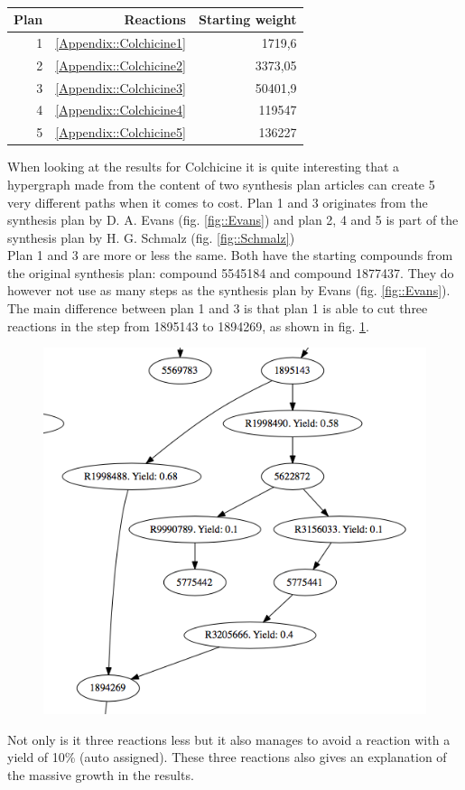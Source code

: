 \documentclass[a4paper,10pt,titlepage]{paper}
\begin{document}
\begin{table}[H]
\centering
\begin{tabular}{|r|r|r|}
\hline
Plan & Reactions & Starting weight \\ \hline
1 & \ref{Appendix::Colchicine1} & 1719,6 \\\hline
2 & \ref{Appendix::Colchicine2} & 3373,05 \\\hline
3 & \ref{Appendix::Colchicine3} & 50401,9 \\\hline
4 & \ref{Appendix::Colchicine4} & 119547 \\\hline
5 & \ref{Appendix::Colchicine5} & 136227 \\\hline
\end{tabular}
\caption{}
\label{tab::ColchicineResults}
\end{table}
When looking at the results for Colchicine it is quite interesting that a hypergraph made from the content of two synthesis plan articles can create 5 very different paths when it comes to cost. Plan 1 and 3 originates from the synthesis plan by D. A. Evans (fig. \ref{fig::Evans}) and plan 2, 4 and 5 is part of the synthesis plan by H. G. Schmalz (fig. \ref{fig::Schmalz})\\

Plan 1 and 3 are more or less the same. Both have the starting compounds from the original synthesis plan: compound 5545184 and compound 1877437. They do however not use as many steps as the synthesis plan by Evans (fig. \ref{fig::Evans}). The main difference between plan 1 and 3 is that plan 1 is able to cut three reactions in the step from 1895143 to 1894269, as shown in fig. \ref{fig::EvansCut}.\\
\begin{figure}[H]
\centering
\includegraphics[scale=0.5]{Billeder/EvansCut.png}
\caption{}
\label{fig::EvansCut}
\end{figure}
Not only is it three reactions less but it also manages to avoid a reaction with a yield of 10\% (auto assigned). These three reactions also gives an explanation of the massive growth in the results.\\
\end{document}
